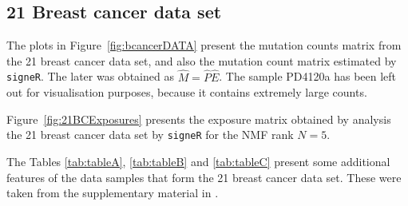 \documentclass[11pt]{amsart}
\theoremstyle{definition}
\begin{document}
\subsection{21 Breast cancer data set}
The plots in Figure~\ref{fig:bcancerDATA} present the mutation
counts matrix from the 21 breast cancer data set, and also the
mutation count matrix estimated by \texttt{signeR}. The later was
obtained as $\widehat M = \widehat P\widehat E$. The sample
PD4120a has been left out for visualisation purposes, because it
contains extremely large counts.


Figure~\ref{fig:21BCExposures} presents the exposure matrix obtained
by analysis the 21 breast cancer data set by \texttt{signeR} for the
NMF rank $N=5$.


The Tables \ref{tab:tableA}, \ref{tab:tableB} and \ref{tab:tableC}
present some additional features of the data samples that form the 21
breast cancer data set. These were taken from the supplementary
material in \cite{NCellFull}. 
\end{document}
